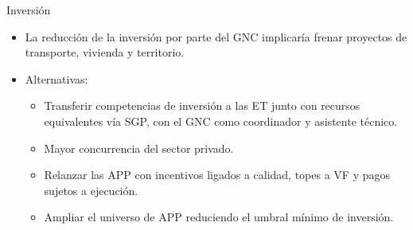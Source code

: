 \begin{frame}{Inversión}
\begin{itemize}
    \item La reducción de la inversión por parte del GNC implicaría frenar proyectos de transporte, vivienda y territorio.
    \item Alternativas:
    \begin{itemize}
        \item Transferir competencias de inversión a las ET junto con recursos equivalentes vía SGP, con el GNC como coordinador y asistente técnico.
        \item Mayor concurrencia del sector privado.
        \item Relanzar las APP con incentivos ligados a calidad, topes a VF y pagos sujetos a ejecución.
        \item Ampliar el universo de APP reduciendo el umbral mínimo de inversión.
    \end{itemize}
\end{itemize}
\end{frame}
